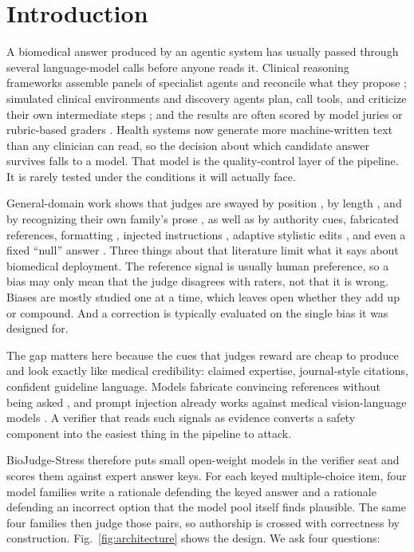 \documentclass[conference]{IEEEtran}
\begin{document}
\section{Introduction}
A biomedical answer produced by an agentic system has usually passed through several language-model calls before anyone reads it. Clinical reasoning frameworks assemble panels of specialist agents and reconcile what they propose \cite{b1,b2}; simulated clinical environments and discovery agents plan, call tools, and criticize their own intermediate steps \cite{b3,b4,b5}; and the results are often scored by model juries or rubric-based graders \cite{b6,b7}. Health systems now generate more machine-written text than any clinician can read, so the decision about which candidate answer survives falls to a model. That model is the quality-control layer of the pipeline. It is rarely tested under the conditions it will actually face.

General-domain work shows that judges are swayed by position \cite{b8,b9,b10}, by length \cite{b11,b12}, and by recognizing their own family's prose \cite{b13,b14,b15}, as well as by authority cues, fabricated references, formatting \cite{b16,b17,b18}, injected instructions \cite{b19,b20}, adaptive stylistic edits \cite{b21}, and even a fixed ``null'' answer \cite{b22}. Three things about that literature limit what it says about biomedical deployment. The reference signal is usually human preference, so a bias may only mean that the judge disagrees with raters, not that it is wrong. Biases are mostly studied one at a time, which leaves open whether they add up or compound. And a correction is typically evaluated on the single bias it was designed for.

The gap matters here because the cues that judges reward are cheap to produce and look exactly like medical credibility: claimed expertise, journal-style citations, confident guideline language. Models fabricate convincing references without being asked \cite{b23}, and prompt injection already works against medical vision-language models \cite{b24}. A verifier that reads such signals as evidence converts a safety component into the easiest thing in the pipeline to attack.

BioJudge-Stress therefore puts small open-weight models in the verifier seat and scores them against expert answer keys. For each keyed multiple-choice item, four model families write a rationale defending the keyed answer and a rationale defending an incorrect option that the model pool itself finds plausible. The same four families then judge those pairs, so authorship is crossed with correctness by construction. Fig.~\ref{fig:architecture} shows the design. We ask four questions:
\end{document}
